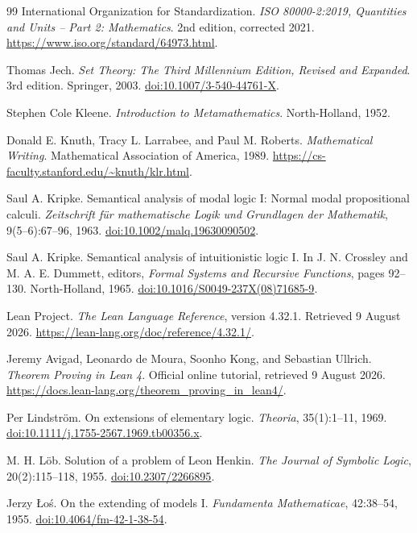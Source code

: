 \begin{thebibliography}{99}
International Organization for Standardization.
\emph{ISO 80000-2:2019, Quantities and Units -- Part 2: Mathematics}.
2nd edition, corrected 2021.
\url{https://www.iso.org/standard/64973.html}.

Thomas Jech.
\emph{Set Theory: The Third Millennium Edition, Revised and Expanded}.
3rd edition. Springer, 2003.
\href{https://doi.org/10.1007/3-540-44761-X}{doi:10.1007/3-540-44761-X}.

Stephen Cole Kleene.
\emph{Introduction to Metamathematics}.
North-Holland, 1952.

Donald E. Knuth, Tracy L. Larrabee, and Paul M. Roberts.
\emph{Mathematical Writing}.
Mathematical Association of America, 1989.
\url{https://cs-faculty.stanford.edu/~knuth/klr.html}.

Saul A. Kripke.
Semantical analysis of modal logic I: Normal modal propositional calculi.
\emph{Zeitschrift f\"ur mathematische Logik und Grundlagen der Mathematik},
9(5--6):67--96, 1963.
\href{https://doi.org/10.1002/malq.19630090502}{doi:10.1002/malq.19630090502}.

Saul A. Kripke.
Semantical analysis of intuitionistic logic I.
In J. N. Crossley and M. A. E. Dummett, editors,
\emph{Formal Systems and Recursive Functions}, pages 92--130.
North-Holland, 1965.
\href{https://doi.org/10.1016/S0049-237X(08)71685-9}{doi:10.1016/S0049-237X(08)71685-9}.

Lean Project.
\emph{The Lean Language Reference}, version 4.32.1.
Retrieved 9 August 2026.
\url{https://lean-lang.org/doc/reference/4.32.1/}.

Jeremy Avigad, Leonardo de Moura, Soonho Kong, and Sebastian Ullrich.
\emph{Theorem Proving in Lean 4}.
Official online tutorial, retrieved 9 August 2026.
\url{https://docs.lean-lang.org/theorem_proving_in_lean4/}.

Per Lindstr\"om.
On extensions of elementary logic.
\emph{Theoria}, 35(1):1--11, 1969.
\href{https://doi.org/10.1111/j.1755-2567.1969.tb00356.x}{doi:10.1111/j.1755-2567.1969.tb00356.x}.

M. H. L\"ob.
Solution of a problem of Leon Henkin.
\emph{The Journal of Symbolic Logic}, 20(2):115--118, 1955.
\href{https://doi.org/10.2307/2266895}{doi:10.2307/2266895}.

Jerzy \L{}o\'s.
On the extending of models I.
\emph{Fundamenta Mathematicae}, 42:38--54, 1955.
\href{https://doi.org/10.4064/fm-42-1-38-54}{doi:10.4064/fm-42-1-38-54}.


\end{thebibliography}
